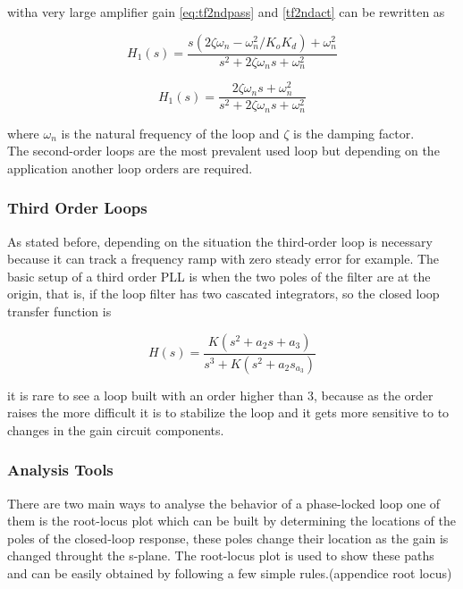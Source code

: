 witha very large amplifier gain \ref{eq:tf2ndpass} and \ref{tf2ndact} can be 
rewritten as

\begin{equation}
    H_1(s)= \frac{s(2\zeta\omega_n-\omega_n^2/K_oK_d)+\omega_n^2}
    {s^2+2\zeta\omega_ns+\omega_n^2}
    \label{eq:damph1}
\end{equation}

\begin{equation}
    H_1(s)= \frac{2\zeta\omega_ns+\omega_n^2}
    {s^2+2\zeta\omega_ns+\omega_n^2}
    \label{eq:damph2}
\end{equation}

where $\omega_n$ is the natural frequency of the loop and $\zeta$ is the damping
factor.\\

The second-order loops are the most prevalent used loop but depending on the
application another loop orders are required.

\subsubsection{Third Order Loops}

As stated before, depending on the situation the third-order loop is necessary
because it can track a frequency ramp with zero steady error for example. The
basic setup of a third order PLL is when the two poles of the filter are at the
origin, that is, if the loop filter has two cascated integrators, so the closed
loop transfer function is

\begin{equation}
    H(s)=\frac{K(s^2+a_2s+a_3)}{s^3+K(s^2+a_2s_a_3)}
    \label{eq:tf3rd}
\end{equation}

it is rare to see a loop built with an order higher than 3, because as the order
raises the more difficult it is to stabilize the loop and it gets more sensitive
to to changes in the gain circuit components.

\subsubsection{Analysis Tools}
There are two main ways to analyse the behavior of a phase-locked loop one of
them is the root-locus plot which can be built by determining the locations of
the poles of the closed-loop response, these poles change their location as the
gain is changed throught the s-plane. The root-locus plot is used to show these
paths and can be easily obtained by following a few simple rules.(appendice root
locus)

